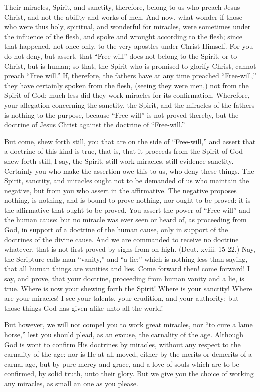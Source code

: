 Their miracles, Spirit, and sanctity, therefore, belong to us who preach Jesus Christ, and not the ability and works of men. And now, what wonder if those who were thus holy, spiritual, and wonderful for miracles, were sometimes under the influence of the flesh, and spoke and wrought according to the flesh; since that happened, not once only, to the very apostles under Christ Himself. For you do not deny, but assert, that “Free-will” does not belong to the Spirit, or to Christ, but is human; so that, the Spirit who is promised to glorify Christ, cannot preach “Free will.” If, therefore, the fathers have at any time preached “Free-will,” they have certainly spoken from the flesh, (seeing they were men,) not from the Spirit of God; much less did they work miracles for its confirmation. Wherefore, your allegation concerning the sanctity, the Spirit, and the miracles of the fathers is nothing to the purpose, because “Free-will” is not proved thereby, but the doctrine of Jesus Christ against the doctrine of “Free-will.”

But come, shew forth still, you that are on the side of “Free-will,” and assert that a doctrine of this kind is true, that is, that it proceeds from the Spirit of God — shew forth still, I say, the Spirit, still work miracles, still evidence sanctity. Certainly you who make the assertion owe this to us, who deny these things. The Spirit, sanctity, and miracles ought not to be demanded of us who maintain the negative, but from you who assert in the affirmative. The negative proposes nothing, is nothing, and is bound to prove nothing, nor ought to be proved: it is the affirmative that ought to be proved. You assert the power of “Free-will” and the human cause: but no miracle was ever seen or heard of, as proceeding from God, in support of a doctrine of the human cause, only in support of the doctrines of the divine cause. And we are commanded to receive no doctrine whatever, that is not first proved by signs from on high. (Deut. xviii. 15-22.) Nay, the Scripture calls man “vanity,” and “a lie:” which is nothing less than saying, that all human things are vanities and lies. Come forward then! come forward! I say, and prove, that your doctrine, proceeding from human vanity and a lie, is true. Where is now your shewing forth the Spirit! Where is your sanctity! Where are your miracles! I see your talents, your erudition, and your authority; but those things God has given alike unto all the world!

But however, we will not compel you to work great miracles, nor “to cure a lame horse,” lest you should plead, as an excuse, the carnality of the age. Although God is wont to confirm His doctrines by miracles, without any respect to the carnality of the age: nor is He at all moved, either by the merits or demerits of a carnal age, but by pure mercy and grace, and a love of souls which are to be confirmed, by solid truth, unto their glory. But we give you the choice of working any miracles, as small an one as you please.

